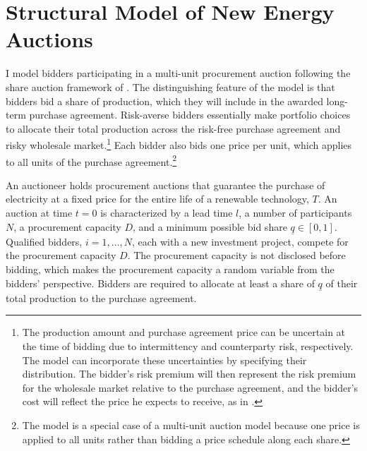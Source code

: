 \documentclass[12pt]{article}
\theoremstyle{definition} %
\begin{document}
\section{Structural Model of New Energy Auctions}
\label{sec:model}

I model bidders participating in a multi-unit procurement auction following the share auction framework of \citet{Wilson1979}. The distinguishing feature of the model is that bidders bid a share of production, which they will include in the awarded long-term purchase agreement. Risk-averse bidders essentially make portfolio choices to allocate their total production across the risk-free purchase agreement and risky wholesale market.\footnote{\label{fn:uncertainty}
The production amount and purchase agreement price can be uncertain at the time of bidding due to intermittency and counterparty risk, respectively. The model can incorporate these uncertainties by specifying their distribution. The bidder's risk premium will then represent the risk premium for the wholesale market relative to the purchase agreement, and the bidder's cost will reflect the price he expects to receive, as in \citet{Ryan2026}.
} Each bidder also bids one price per unit, which applies to all units of the purchase agreement.\footnote{
The model is a special case of a multi-unit auction model because one price is applied to all units rather than bidding a price schedule along each share.
}


An auctioneer holds procurement auctions that guarantee the purchase of electricity at a fixed price for the entire life of a renewable technology, $T$. An auction at time $t=0$ is characterized by a lead time $l $, a number of participants $N $, a procurement capacity $D$, and a minimum possible bid share $\underline{q} \in [0,1]$. Qualified bidders, $i=1,\dots,N$, each with a new investment project, compete for the procurement capacity $D$. The procurement capacity is not disclosed before bidding, which makes the procurement capacity a random variable from the bidders' perspective. Bidders are required to allocate at least a share of $\underline{q}$ of their total production to the purchase agreement.
\end{document}
